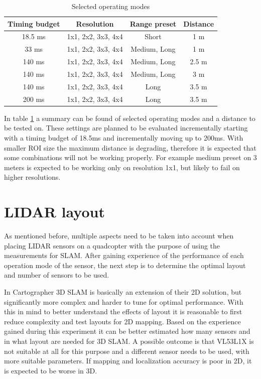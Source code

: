 \begin{table}[ht]
	\centering
	\begin{tabular}{||c c c c||}
		\hline
        Timing budget       & Resolution        & Range preset      & Distance  \\
		\hline\hline
        18.5 ms      & 1x1, 2x2, 3x3, 4x4      & Short      & 1 m \\
		\hline
        33 ms        & 1x1, 2x2, 3x3, 4x4      & Medium, Long       & 1 m \\
		\hline
        140 ms       & 1x1, 2x2, 3x3, 4x4      & Medium, Long       & 2.5 m \\
		\hline
        140 ms       & 1x1, 2x2, 3x3, 4x4      & Medium, Long       & 3 m \\
		\hline
        140 ms       & 1x1, 2x2, 3x3, 4x4      & Long       & 3.5 m \\
		\hline
        200 ms       & 1x1, 2x2, 3x3, 4x4      & Long       & 3.5 m \\
		\hline
	\end{tabular}
	\caption{Selected operating modes}
	\label{tab:selected_operating_modes}
\end{table}

In table \ref{tab:selected_operating_modes} a summary can be found of selected operating modes and a 
distance to be tested on. These settings are planned to be evaluated incrementally starting with a 
timing budget of 18.5ms and incrementally moving up to 200ms. With smaller ROI size the maximum 
distance is degrading, therefore it is expected that some combinations will not be working 
properly. For example medium preset on 3 meters is expected to be working only on resolution 1x1, 
but likely to fail on higher resolutions.








\section{LIDAR layout} \label{sect:lidar_layout_plan}
As mentioned before, multiple aspects need to be taken into account when placing LIDAR sensors on a
quadcopter with the purpose of using the measurements for SLAM. After gaining experience of the performance
of each operation mode of the sensor, the next step is to determine the optimal layout and number of sensors 
to be used. 

In Cartographer 3D SLAM is basically an extension of their 2D solution, but significantly more complex and 
harder to tune for optimal performance. With this in mind to better understand the effects of
layout it is reasonable to first reduce complexity and test layouts for 2D mapping. Based on 
the experience gained during this experiment it can be better estimated how many sensors and in what layout
are needed for 3D SLAM. A possible outcome is that VL53L1X is not suitable at all for this purpose and
a different sensor needs to be used, with more suitable parameters. If mapping and localization accuracy 
is poor in 2D, it is expected to be worse in 3D.

